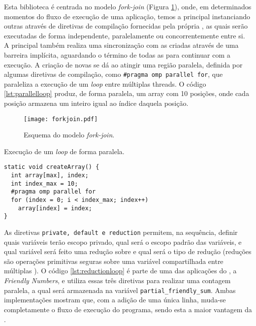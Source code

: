 Esta biblioteca é centrada no modelo \textit{fork-join} (Figura \ref{fig:forkjoin}), onde, em determinados momentos do fluxo de execução de uma aplicação, temos a \thread principal instanciando outras \threads através de diretivas de compilação fornecidas pela própria \API, as quais serão executadas de forma independente, paralelamente ou concorrentemente entre si. A \thread principal também realiza uma sincronização com as \threads criadas através de uma barreira implícita, aguardando o término de todas as \threads para continuar com a execução. A criação de novas \threads se dá ao atingir uma região paralela, definida por algumas diretivas de compilação, como \texttt{\#pragma omp parallel for}, que paraleliza a execução de um \textit{loop} entre múltiplas threads. O código \ref{lst:parallelloop} produz, de forma paralela, um array com 10 posições, onde cada posição armazena um inteiro igual ao índice daquela posição.


\begin{figure}[tb]
  \centering
  \caption{Esquema do modelo \textit{fork-join}.}
  \label{fig:forkjoin}
  \texttt{[image: forkjoin.pdf]}
\end{figure}

\begin{listing}[tb]
\caption{Execução de um \textit{loop} de forma paralela.}
\label{lst:parallelloop}
\begin{verbatim}
static void createArray() {
  int array[max], index;
  int index_max = 10;
  #pragma omp parallel for
  for (index = 0; i < index_max; index++)
    array[index] = index;
}
\end{verbatim}
\end{listing}

As diretivas \texttt{private, default e reduction} permitem, na sequência, definir quais variáveis terão escopo privado, qual será o escopo padrão das variáveis, e qual variável será feito uma redução sobre e qual será o tipo de redução (reduções são operações primitivas seguras sobre uma variável compartilhada entre múltiplas \threads). O código \ref{lst:reductionloop} é parte de uma das aplicações do \capb, a \textit{Friendly Numbers}, e utiliza essas três diretivas para realizar uma contagem paralela, a qual será armazenada na variável \texttt{partial\_friendly\_sum}. Ambas implementações mostram que, com a adição de uma única linha, muda-se completamente o fluxo de execução do programa, sendo esta a maior vantagem da \OpenMP.

